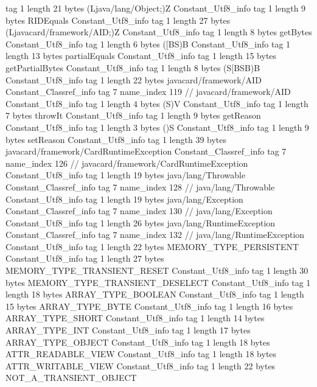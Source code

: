 {{{			tag	1
			length	21
			bytes	(Ljava/lang/Object;)Z
		}
		Constant_Utf8_info {
			tag	1
			length	9
			bytes	RIDEquals
		}
		Constant_Utf8_info {
			tag	1
			length	27
			bytes	(Ljavacard/framework/AID;)Z
		}
		Constant_Utf8_info {
			tag	1
			length	8
			bytes	getBytes
		}
		Constant_Utf8_info {
			tag	1
			length	6
			bytes	([BS)B
		}
		Constant_Utf8_info {
			tag	1
			length	13
			bytes	partialEquals
		}
		Constant_Utf8_info {
			tag	1
			length	15
			bytes	getPartialBytes
		}
		Constant_Utf8_info {
			tag	1
			length	8
			bytes	(S[BSB)B
		}
		Constant_Utf8_info {
			tag	1
			length	22
			bytes	javacard/framework/AID
		}
		Constant_Classref_info {
			tag	7
			name_index	119		// javacard/framework/AID
		}
		Constant_Utf8_info {
			tag	1
			length	4
			bytes	(S)V
		}
		Constant_Utf8_info {
			tag	1
			length	7
			bytes	throwIt
		}
		Constant_Utf8_info {
			tag	1
			length	9
			bytes	getReason
		}
		Constant_Utf8_info {
			tag	1
			length	3
			bytes	()S
		}
		Constant_Utf8_info {
			tag	1
			length	9
			bytes	setReason
		}
		Constant_Utf8_info {
			tag	1
			length	39
			bytes	javacard/framework/CardRuntimeException
		}
		Constant_Classref_info {
			tag	7
			name_index	126		// javacard/framework/CardRuntimeException
		}
		Constant_Utf8_info {
			tag	1
			length	19
			bytes	java/lang/Throwable
		}
		Constant_Classref_info {
			tag	7
			name_index	128		// java/lang/Throwable
		}
		Constant_Utf8_info {
			tag	1
			length	19
			bytes	java/lang/Exception
		}
		Constant_Classref_info {
			tag	7
			name_index	130		// java/lang/Exception
		}
		Constant_Utf8_info {
			tag	1
			length	26
			bytes	java/lang/RuntimeException
		}
		Constant_Classref_info {
			tag	7
			name_index	132		// java/lang/RuntimeException
		}
		Constant_Utf8_info {
			tag	1
			length	22
			bytes	MEMORY_TYPE_PERSISTENT
		}
		Constant_Utf8_info {
			tag	1
			length	27
			bytes	MEMORY_TYPE_TRANSIENT_RESET
		}
		Constant_Utf8_info {
			tag	1
			length	30
			bytes	MEMORY_TYPE_TRANSIENT_DESELECT
		}
		Constant_Utf8_info {
			tag	1
			length	18
			bytes	ARRAY_TYPE_BOOLEAN
		}
		Constant_Utf8_info {
			tag	1
			length	15
			bytes	ARRAY_TYPE_BYTE
		}
		Constant_Utf8_info {
			tag	1
			length	16
			bytes	ARRAY_TYPE_SHORT
		}
		Constant_Utf8_info {
			tag	1
			length	14
			bytes	ARRAY_TYPE_INT
		}
		Constant_Utf8_info {
			tag	1
			length	17
			bytes	ARRAY_TYPE_OBJECT
		}
		Constant_Utf8_info {
			tag	1
			length	18
			bytes	ATTR_READABLE_VIEW
		}
		Constant_Utf8_info {
			tag	1
			length	18
			bytes	ATTR_WRITABLE_VIEW
		}
		Constant_Utf8_info {
			tag	1
			length	22
			bytes	NOT_A_TRANSIENT_OBJECT
		}
}}
